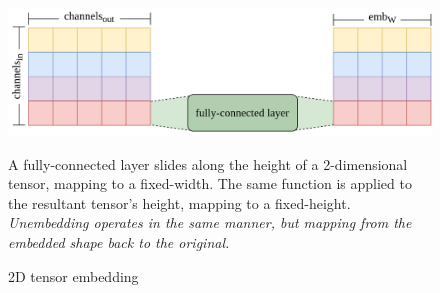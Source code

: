 \documentclass{report}
\begin{document}
\begin{figure}[h!]
	\centering
	\includegraphics[width=12cm]{embedding}
	\caption{2D tensor embedding}
	\label{fig:embedding:1}
	A fully-connected layer slides along the height of a 2-dimensional tensor, mapping to a fixed-width. The same function is applied to the resultant tensor's height, mapping to a fixed-height. \textit{Unembedding operates in the same manner, but mapping from the embedded shape back to the original.}
\end{figure}
\end{document}
